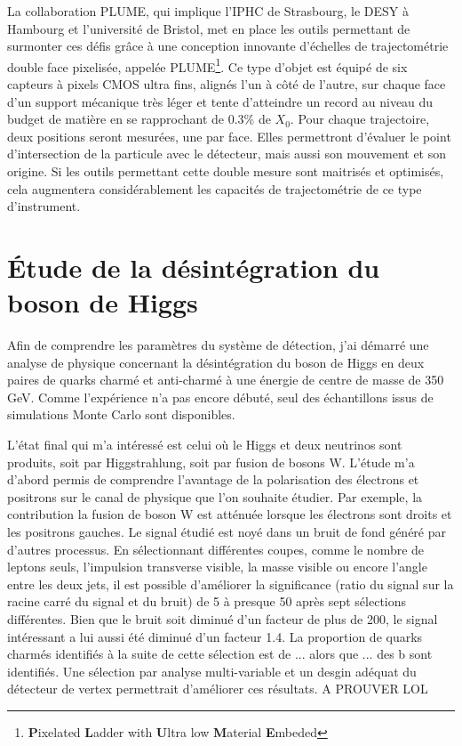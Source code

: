 \documentclass[a4papper, 10pt]{article}
\begin{document}
  La collaboration PLUME, qui implique l'IPHC de Strasbourg, le DESY à Hambourg et l'université de Bristol, met en place les outils permettant de surmonter ces défis grâce à une conception innovante d'échelles de trajectométrie double face pixelisée, appelée PLUME\footnote{\textbf{P}ixelated \textbf{L}adder with \textbf{U}ltra low \textbf{M}aterial \textbf{E}mbeded}. 
  Ce type d'objet est équipé de six capteurs à pixels CMOS ultra fins, alignés l'un à côté de l'autre, sur chaque face d'un support mécanique très léger et tente d'atteindre un record au niveau du budget de matière en se rapprochant de 0.3\% de $X_0$.
  Pour chaque trajectoire, deux positions seront mesurées, une par face. 
  Elles permettront d'évaluer le point d'intersection de la particule avec le détecteur, mais aussi son mouvement et son origine. 
  Si les outils permettant cette double mesure sont maitrisés et optimisés, cela augmentera considérablement les capacités de trajectométrie de ce type d'instrument.

  \section{Étude de la désintégration du boson de Higgs}

  Afin de comprendre les paramètres du système de détection, j'ai démarré une analyse de physique concernant la désintégration du boson de Higgs en deux paires de quarks charmé et anti-charmé à une énergie de centre de masse de 350 GeV.
  Comme l'expérience n'a pas encore débuté, seul des échantillons issus de simulations Monte Carlo sont disponibles.


  L'état final qui m'a intéressé est celui où le Higgs et deux neutrinos sont produits, soit par Higgstrahlung, soit par fusion de bosons W.
  L'étude m'a d'abord permis de comprendre l'avantage de la polarisation des électrons et positrons sur le canal de physique que l'on souhaite étudier.
  Par exemple, la contribution la fusion de boson W est atténuée lorsque les électrons sont droits et les positrons gauches.
  Le signal étudié est noyé dans un bruit de fond généré par d'autres processus. 
  En sélectionnant différentes coupes, comme le nombre de leptons seuls, l'impulsion transverse visible, la masse visible ou encore l'angle entre les deux jets, il est possible d'améliorer la significance (ratio du signal sur la racine carré du signal et du bruit) de 5 à presque 50 après sept sélections différentes. 
  Bien que le bruit soit diminué d'un facteur de plus de 200, le signal intéressant a lui aussi été diminué d'un facteur 1.4.
  La proportion de quarks charmés identifiés à la suite de cette sélection est de ... alors que ... des b sont identifiés. 
  Une sélection par analyse multi-variable et un desgin adéquat du détecteur de vertex permettrait d'améliorer ces résultats. A PROUVER LOL
\end{document}
